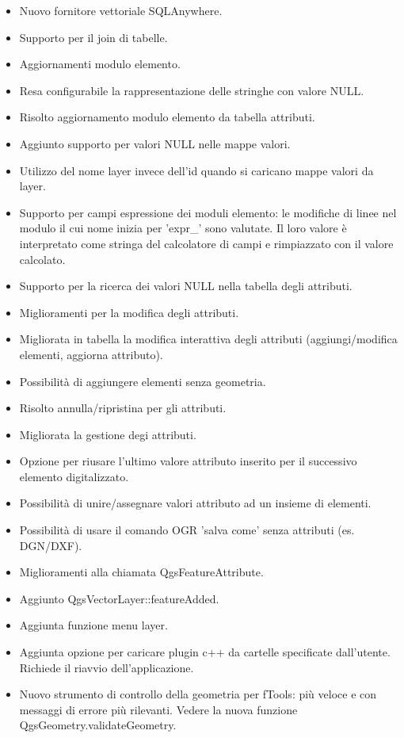 \begin{itemize}[label=--]
\item Nuovo fornitore vettoriale SQLAnywhere.
\item Supporto per il join di tabelle.
\item Aggiornamenti modulo elemento.
\item Resa configurabile la rappresentazione delle stringhe con valore NULL.
\item Risolto aggiornamento modulo elemento da tabella attributi.
\item Aggiunto supporto per valori NULL nelle mappe valori.
\item Utilizzo del nome layer invece dell'id quando si caricano mappe valori da layer.
\item Supporto per campi espressione dei moduli elemento: le modifiche di linee nel modulo il cui nome inizia 
per 'expr\_' sono valutate. Il loro valore è interpretato come stringa del calcolatore di campi e rimpiazzato 
con il valore calcolato.
\item Supporto per la ricerca dei valori NULL nella tabella degli attributi.
\item Miglioramenti per la modifica degli attributi.
\item Migliorata in tabella la modifica interattiva degli attributi (aggiungi/modifica elementi, aggiorna attributo).
\item Possibilità di aggiungere elementi senza geometria.
\item Risolto annulla/ripristina per gli attributi.
\item Migliorata la gestione degi attributi.
\item Opzione per riusare l'ultimo valore attributo inserito per il successivo elemento digitalizzato.
\item Possibilità di unire/assegnare valori attributo ad un insieme di elementi.
\item Possibilità di usare il comando OGR 'salva come' senza attributi (es. DGN/DXF).
\end{itemize}


\begin{itemize}[label=--]
\item Miglioramenti alla chiamata QgsFeatureAttribute.
\item Aggiunto QgsVectorLayer::featureAdded.
\item Aggiunta funzione menu layer.
\item Aggiunta opzione per caricare plugin c++ da cartelle specificate dall'utente. Richiede il riavvio dell'applicazione.
\item Nuovo strumento di controllo della geometria per fTools: più veloce e con messaggi di errore più rilevanti. 
Vedere la nuova funzione QgsGeometry.validateGeometry.
\end{itemize}

